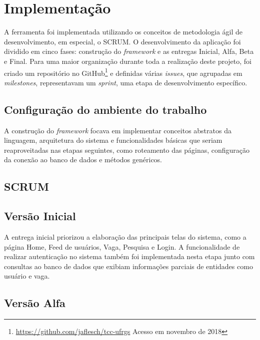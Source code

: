 \documentclass[cic,tc]{iiufrgs}
\begin{document}
\section{Implementação}
\label{metodologiaImplementação}

A ferramenta foi implementada utilizando os conceitos de metodologia ágil de desenvolvimento, em especial, o SCRUM. O desenvolvimento da aplicação foi dividido em cinco fases: construção do \textit{framework} e  as entregas Inicial, Alfa, Beta e Final. Para uma maior organização durante toda a realização deste projeto, foi criado um repositório no GitHub\footnote{\url{https://github.com/jaflesch/tcc-ufrgs} Acesso em novembro de 2018} e definidas várias \textit{issues}, que agrupadas em \textit{milestones}, representavam um \textit{sprint}, uma etapa de desenvolvimento específico.

\subsection{Configuração do ambiente do trabalho}
\label{implementacaoConfig}

A construção do \textit{framework} focava em implementar conceitos abstratos da linguagem, arquitetura do sistema e funcionalidades básicas que seriam reaproveitadas nas etapas seguintes, como roteamento das páginas, configuração da conexão ao banco de dados e métodos genéricos.


\subsection{SCRUM}
\label{implementacaoSCRUM}

\subsection{Versão Inicial}
\label{implementacaoIR}

A entrega inicial priorizou a elaboração das principais telas do sistema, como a página Home, Feed de usuários, Vaga, Pesquisa e Login. A funcionalidade de realizar autenticação no sistema também foi implementada nesta etapa junto com consultas ao banco de dados que exibiam informações parciais de entidades como usuário e vaga.

\subsection{Versão Alfa}
\label{implementacaoAR}
\end{document}
